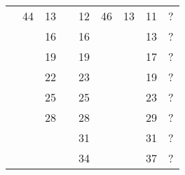 \documentclass[12pt]{jarticle}
\begin{document}
\begin{table}[h]
\begin{center}
\begin{tabular}{|c|r|r|r|r|r|r|r|r|}
                                         & 44                            & 13                            &                               & 12                            & 46                            & 13                            & 11                            & ?                             \\
                                         &                               & 16                            &                               & 16                            &                               &                               & 13                            & ?                             \\
                                         &                               & 19                            &                               & 19                            &                               &                               & 17                            & ?                             \\
                                         &                               & 22                            &                               & 23                            &                               &                               & 19                            & ?                             \\
                                         &                               & 25                            &                               & 25                            &                               &                               & 23                            & ?                             \\
                                         &                               & 28                            &                               & 28                            &                               &                               & 29                            & ?                             \\
                                         &                               &                               &                               & 31                            &                               &                               & 31                            & ?                             \\
                                         &                               &                               &                               & 34                            &                               &                               & 37                            & ?                             \\

\end{tabular}
\end{center}
\end{table}
\end{document}

